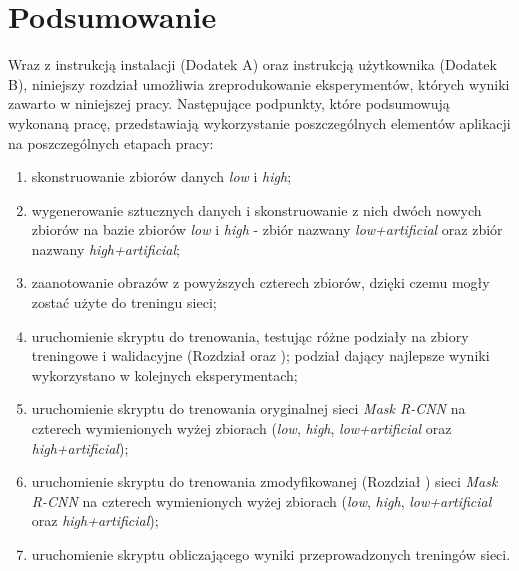\section{Podsumowanie}
Wraz z instrukcją instalacji (Dodatek A) oraz instrukcją użytkownika (Dodatek B), niniejszy rozdział umożliwia zreprodukowanie eksperymentów, których wyniki zawarto w niniejszej pracy.
Następujące podpunkty, które podsumowują wykonaną pracę, przedstawiają wykorzystanie poszczególnych elementów aplikacji na poszczególnych etapach pracy:

\begin{enumerate}
 \item skonstruowanie zbiorów danych \textit{low} i \textit{high};
 \item wygenerowanie sztucznych danych i skonstruowanie z nich dwóch nowych zbiorów na bazie zbiorów \textit{low} i \textit{high} - zbiór nazwany \textit{low+artificial} oraz zbiór nazwany \textit{high+artificial};
 \item zaanotowanie obrazów z powyższych czterech zbiorów, dzięki czemu mogły zostać użyte do treningu sieci;
 \item uruchomienie skryptu do trenowania, testując różne podziały na zbiory treningowe i walidacyjne (Rozdział  oraz ); podział dający najlepsze wyniki wykorzystano w kolejnych eksperymentach;
 \item uruchomienie skryptu do trenowania oryginalnej sieci \textit{Mask R-CNN} na czterech wymienionych wyżej zbiorach (\textit{low}, \textit{high}, \textit{low+artificial} oraz \textit{high+artificial});
 \item uruchomienie skryptu do trenowania zmodyfikowanej (Rozdział ) sieci \textit{Mask R-CNN} na czterech wymienionych wyżej zbiorach (\textit{low}, \textit{high}, \textit{low+artificial} oraz \textit{high+artificial});
 \item uruchomienie skryptu obliczającego wyniki przeprowadzonych treningów sieci.
\end{enumerate}
